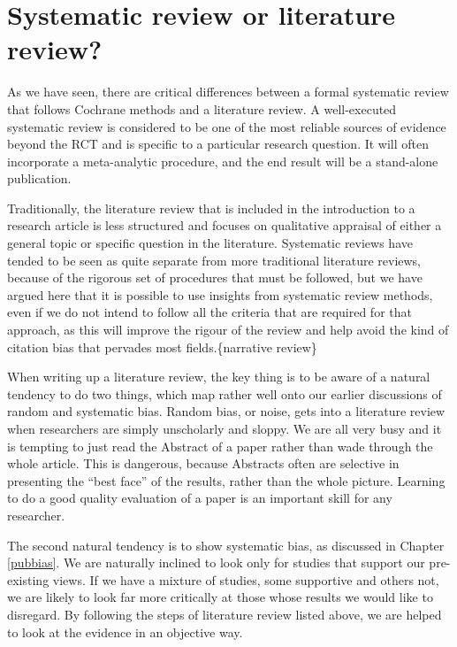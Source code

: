 \documentclass{krantz}
\begin{document}
\hypertarget{systematic-review-or-literature-review}{%
\section{Systematic review or literature review?}\label{systematic-review-or-literature-review}}

As we have seen, there are critical differences between a formal systematic review that follows Cochrane methods and a literature review. A well-executed systematic review is considered to be one of the most reliable sources of evidence beyond the RCT and is specific to a particular research question. It will often incorporate a meta-analytic procedure, and the end result will be a stand-alone publication.

Traditionally, the literature review that is included in the introduction to a research article is less structured and focuses on qualitative appraisal of either a general topic or specific question in the literature. Systematic reviews have tended to be seen as quite separate from more traditional literature reviews, because of the rigorous set of procedures that must be followed, but we have argued here that it is possible to use insights from systematic review methods, even if we do not intend to follow all the criteria that are required for that approach, as this will improve the rigour of the review and help avoid the kind of citation bias that pervades most fields.\index\{narrative review\}

When writing up a literature review, the key thing is to be aware of a natural tendency to do two things, which map rather well onto our earlier discussions of random and systematic bias. Random bias, or noise, gets into a literature review when researchers are simply unscholarly and sloppy. We are all very busy and it is tempting to just read the Abstract of a paper rather than wade through the whole article. This is dangerous, because Abstracts often are selective in presenting the ``best face'' of the results, rather than the whole picture. Learning to do a good quality evaluation of a paper is an important skill for any researcher.

The second natural tendency is to show systematic bias, as discussed in Chapter \ref{pubbias}. We are naturally inclined to look only for studies that support our pre-existing views. If we have a mixture of studies, some supportive and others not, we are likely to look far more critically at those whose results we would like to disregard. By following the steps of literature review listed above, we are helped to look at the evidence in an objective way.
\end{document}
